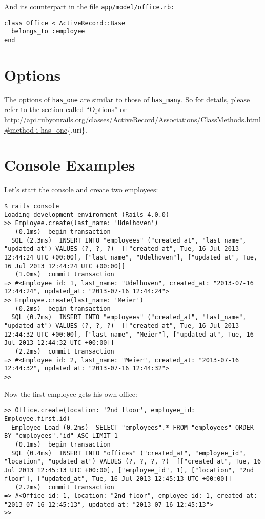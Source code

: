 \documentclass[a4paper]{book}
\newcommand{\chap}[1]{\newpage\thispagestyle{empty}\chapter{#1}\label{chap:\thechapter}}
\begin{document}
And its counterpart in the file \texttt{app/model/office.rb:}

\begin{shaded}\begin{verbatim}
class Office < ActiveRecord::Base
  belongs_to :employee
end
\end{verbatim}\end{shaded}

\chap{Options}\label{options-1}

The options of \texttt{has\_one} are similar to those of \texttt{has\_many}. So for details, please refer to \hyperref[activerecordux5f1nux5foptionen]{the section called “Options”} or \url{http://api.rubyonrails.org/classes/ActiveRecord/Associations/ClassMethods.html\#method-i-has_one}\{.uri\}.

\chap{Console Examples}\label{console-examples}

Let's start the console and create two employees:

\begin{shaded}\begin{verbatim}
$ rails console
Loading development environment (Rails 4.0.0)
>> Employee.create(last_name: 'Udelhoven')
   (0.1ms)  begin transaction
  SQL (2.3ms)  INSERT INTO "employees" ("created_at", "last_name", "updated_at") VALUES (?, ?, ?)  [["created_at", Tue, 16 Jul 2013 12:44:24 UTC +00:00], ["last_name", "Udelhoven"], ["updated_at", Tue, 16 Jul 2013 12:44:24 UTC +00:00]]
   (1.0ms)  commit transaction
=> #<Employee id: 1, last_name: "Udelhoven", created_at: "2013-07-16 12:44:24", updated_at: "2013-07-16 12:44:24">
>> Employee.create(last_name: 'Meier')
   (0.2ms)  begin transaction
  SQL (0.7ms)  INSERT INTO "employees" ("created_at", "last_name", "updated_at") VALUES (?, ?, ?)  [["created_at", Tue, 16 Jul 2013 12:44:32 UTC +00:00], ["last_name", "Meier"], ["updated_at", Tue, 16 Jul 2013 12:44:32 UTC +00:00]]
   (2.2ms)  commit transaction
=> #<Employee id: 2, last_name: "Meier", created_at: "2013-07-16 12:44:32", updated_at: "2013-07-16 12:44:32">
>>
\end{verbatim}\end{shaded}

Now the first employee gets his own office:

\begin{shaded}\begin{verbatim}
>> Office.create(location: '2nd floor', employee_id: Employee.first.id)
  Employee Load (0.2ms)  SELECT "employees".* FROM "employees" ORDER BY "employees"."id" ASC LIMIT 1
   (0.1ms)  begin transaction
  SQL (0.4ms)  INSERT INTO "offices" ("created_at", "employee_id", "location", "updated_at") VALUES (?, ?, ?, ?)  [["created_at", Tue, 16 Jul 2013 12:45:13 UTC +00:00], ["employee_id", 1], ["location", "2nd floor"], ["updated_at", Tue, 16 Jul 2013 12:45:13 UTC +00:00]]
   (2.2ms)  commit transaction
=> #<Office id: 1, location: "2nd floor", employee_id: 1, created_at: "2013-07-16 12:45:13", updated_at: "2013-07-16 12:45:13">
>>
\end{verbatim}\end{shaded}
\end{document}

